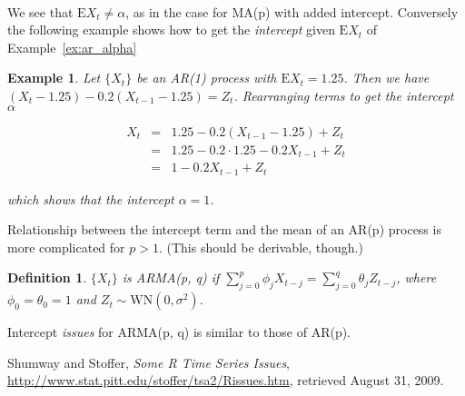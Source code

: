 \documentclass{article}
\newtheorem{definition}{Definition}
\newtheorem{example}{Example}
\newcommand{\Xt}{\{X_{t}\}}
\newcommand{\E}{\mathrm{E}}
\begin{document}
\noindent \qedsymbol\\

\noindent We see that $\E X_{t} \neq \alpha$, as in the case for MA(p)
with added intercept. Conversely the following example shows how to get the 
\textit{intercept} given $\E X_{t}$ of Example~\ref{ex:ar_alpha}

\begin{example}\label{ex:ar_mean}\normalfont
Let $\Xt$ be an AR(1) process with $\E X_{t} = 1.25$. Then we have
$(X_{t} - 1.25) - 0.2(X_{t-1} - 1.25) = Z_{t}$. Rearranging terms to get
the intercept $\alpha$

\begin{eqnarray}
X_{t} & = & 1.25 - 0.2(X_{t-1} - 1.25) + Z_{t} \nonumber\\
  & = & 1.25 - 0.2 \cdot 1.25 - 0.2 X_{t-1} + Z_{t} \nonumber\\
  & = & 1 - 0.2 X_{t-1} + Z_{t} \nonumber
\end{eqnarray}

\noindent which shows that the intercept $\alpha=1$. \qedsymbol 
\end{example}

\noindent Relationship between the intercept term and the mean of an AR(p)
process is more complicated for $p > 1$. (This should be derivable, though.)

\begin{definition}\normalfont
$\Xt$ is ARMA(p, q) if $\sum_{j=0}^{p} \phi_{j} X_{t-j} = 
\sum_{j=0}^{q} \theta_{j} Z_{t-j}$, where 
$\phi_{0} = \theta_{0} = 1$ and $Z_{t} \sim \mathrm{WN}(0, \sigma^2)$.
\end{definition}

\noindent Intercept \textit{issues} for ARMA(p, q) is similar to those of
AR(p).

\begin{thebibliography}{9}
 Shumway and Stoffer,
\emph{Some R Time Series Issues},  
\url{http://www.stat.pitt.edu/stoffer/tsa2/Rissues.htm},
retrieved August 31, 2009.
\end{thebibliography}
\end{document}

